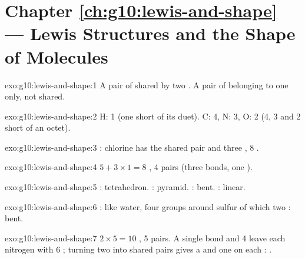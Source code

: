 \section*{Chapter \ref{ch:g10:lewis-and-shape} --- Lewis Structures and the Shape of Molecules}

\begin{solution}{exo:g10:lewis-and-shape:1}
A pair of  shared by two . A pair of 
belonging to one  only, not shared.
\end{solution}

\begin{solution}{exo:g10:lewis-and-shape:2}
H: 1 (one  short of its duet). C: 4, N: 3, O: 2 (4, 3 and 2
 short of an octet).
\end{solution}

\begin{solution}{exo:g10:lewis-and-shape:3}
: chlorine has the shared pair and three , 8 .
\end{solution}

\begin{solution}{exo:g10:lewis-and-shape:4}
$5 + 3 \times 1 = 8$ , 4 pairs (three bonds, one ).
\end{solution}

\begin{solution}{exo:g10:lewis-and-shape:5}
: tetrahedron. : pyramid. : bent. :
linear.
\end{solution}

\begin{solution}{exo:g10:lewis-and-shape:6}
: like water, four groups around sulfur of
which two : bent.
\end{solution}

\begin{solution}{exo:g10:lewis-and-shape:7}
$2 \times 5 = 10$ , 5 pairs. A single bond and 4  leave
each nitrogen with 6 ; turning two  into shared pairs
gives a  and one  on each :
.
\end{solution}

